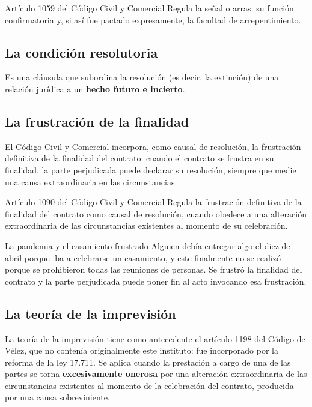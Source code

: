\documentclass[12pt,oneside]{book}
\begin{document}
\begin{articulo}{Artículo 1059 del Código Civil y Comercial}
Regula la señal o arras: su función confirmatoria y, si así fue pactado expresamente, la facultad de arrepentimiento.
\end{articulo}

\subsection{La condición resolutoria}

Es una cláusula que subordina la resolución (es decir, la extinción) de una relación jurídica a un \textbf{hecho futuro e incierto}.

\subsection{La frustración de la finalidad}

El Código Civil y Comercial incorpora, como causal de resolución, la frustración definitiva de la finalidad del contrato: cuando el contrato se frustra en su finalidad, la parte perjudicada puede declarar su resolución, siempre que medie una causa extraordinaria en las circunstancias.

\begin{articulo}{Artículo 1090 del Código Civil y Comercial}
Regula la frustración definitiva de la finalidad del contrato como causal de resolución, cuando obedece a una alteración extraordinaria de las circunstancias existentes al momento de su celebración.
\end{articulo}

\begin{example}{La pandemia y el casamiento frustrado}
Alguien debía entregar algo el diez de abril porque iba a celebrarse un casamiento, y este finalmente no se realizó porque se prohibieron todas las reuniones de personas. Se frustró la finalidad del contrato y la parte perjudicada puede poner fin al acto invocando esa frustración.
\end{example}

\subsection{La teoría de la imprevisión}

La teoría de la imprevisión tiene como antecedente el artículo 1198 del Código de Vélez, que no contenía originalmente este instituto: fue incorporado por la reforma de la ley 17.711. Se aplica cuando la prestación a cargo de una de las partes se torna \textbf{excesivamente onerosa} por una alteración extraordinaria de las circunstancias existentes al momento de la celebración del contrato, producida por una causa sobreviniente.
\end{document}
